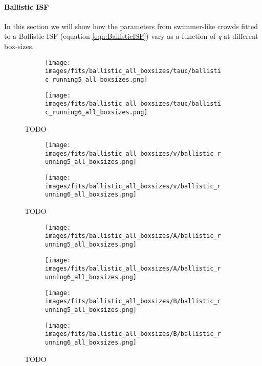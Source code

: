 \documentclass[10pt]{article}
\begin{document}
\paragraph{Ballistic ISF} In this section we will show how the parameters from swimmer-like crowds fitted to a Ballistic ISF (equation \ref{eqn:BallisticISF}) vary as a function of \textit{q} at different box-sizes. 

\begin{figure}[H]
\begin{subfigure}[t]{\textwidth}
  \centering
 \texttt{[image: images/fits/ballistic\_all\_boxsizes/tauc/ballistic\_running5\_all\_boxsizes.png]}
  \caption{}
\end{subfigure}%
\hfill
\begin{subfigure}[t]{\textwidth}
  \centering
  \texttt{[image: images/fits/ballistic\_all\_boxsizes/tauc/ballistic\_running6\_all\_boxsizes.png]}
  \caption{}
\end{subfigure}
\caption{TODO }
\label{fig:running_ballistic_fits_tauc_all_boxsizes}
\end{figure}

\begin{figure}[H]
\begin{subfigure}[t]{\textwidth}
  \centering
 \texttt{[image: images/fits/ballistic\_all\_boxsizes/v/ballistic\_running5\_all\_boxsizes.png]}
  \caption{}
\end{subfigure}%
\hfill
\begin{subfigure}[t]{\textwidth}
  \centering
  \texttt{[image: images/fits/ballistic\_all\_boxsizes/v/ballistic\_running6\_all\_boxsizes.png]}
  \caption{}
\end{subfigure}
\caption{TODO}
\label{fig:running_ballistic_fits_v_all_boxsizes}
\end{figure}

\begin{figure}[H]
\begin{subfigure}[t]{.5\textwidth}
  \centering
 \texttt{[image: images/fits/ballistic\_all\_boxsizes/A/ballistic\_running5\_all\_boxsizes.png]}
  \caption{}
\end{subfigure}%
\hfill
\begin{subfigure}[t]{.5\textwidth}
  \centering
  \texttt{[image: images/fits/ballistic\_all\_boxsizes/A/ballistic\_running6\_all\_boxsizes.png]}
  \caption{}
\end{subfigure}
\label{fig:running_ballistic_fits_A_all_boxsizes}
\par\bigskip
\begin{subfigure}[t]{.5\textwidth}
  \centering
 \texttt{[image: images/fits/ballistic\_all\_boxsizes/B/ballistic\_running5\_all\_boxsizes.png]}
  \caption{}
\end{subfigure}%
\hfill
\begin{subfigure}[t]{.5\textwidth}
  \centering
  \texttt{[image: images/fits/ballistic\_all\_boxsizes/B/ballistic\_running6\_all\_boxsizes.png]}
  \caption{}
\end{subfigure}
\caption{TODO}
\label{fig:running_ballistic_fits_tauc_B_boxsizes}
\end{figure}
\end{document}
